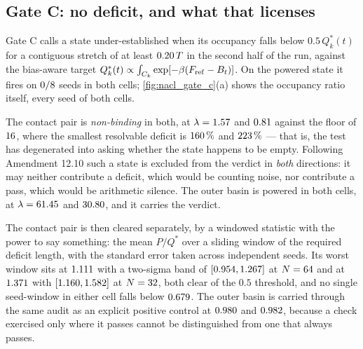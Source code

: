 \subsection{Gate C: no deficit, and what that licenses}

Gate C calls a state under-established when its occupancy falls below $0.5\,Q^*_k(t)$ for a
contiguous stretch of at least $0.20\,T$ in the second half of the run, against the
bias-aware target $Q^*_k(t) \propto \int_{C_k} \exp[-\beta(F_{\rm ref} - B_t)]$. On the powered
state it fires on $0/8$ seeds in both cells; \cref{fig:nacl_gate_c}(a) shows the
occupancy ratio itself, every seed of both cells.

The contact pair is \emph{non-binding} in both, at $\lambda = 1.57$ and $0.81$
against the floor of $16$, where the smallest resolvable deficit is $160\,\%$
and $223\,\%$ --- that is, the test has degenerated into asking whether the state happens
to be empty. Following Amendment 12.10 such a state is excluded from the verdict in
\emph{both} directions: it may neither contribute a deficit, which would be counting noise, nor
contribute a pass, which would be arithmetic silence. The outer basin is powered in both cells,
at $\lambda = 61.45$ and $30.80$, and it carries the verdict.

The contact pair is then cleared separately, by a windowed statistic with the power to say
something: the mean $P/Q^*$ over a sliding window of the required deficit length, with the
standard error taken across independent seeds. Its worst window sits at $1.111$ with a
two-sigma band of $[0.954, 1.267]$ at $N = 64$ and at $1.371$ with
$[1.160, 1.582]$ at $N = 32$, both clear of the $0.5$ threshold, and no
single seed-window in either cell falls below $0.679$. The outer basin is carried
through the same audit as an explicit positive control at $0.980$ and $0.982$,
because a check exercised only where it passes cannot be distinguished from one that always
passes.

